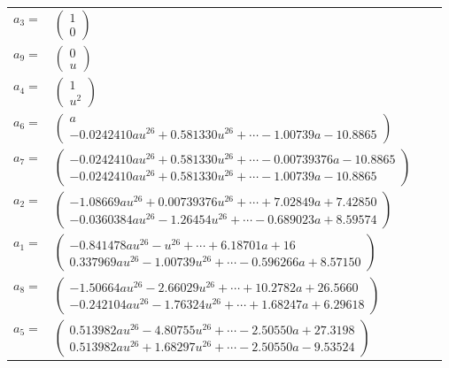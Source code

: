 \documentclass[1p]{elsarticle_modified}
\theoremstyle{definition}
\begin{document}
\begin{tabular}{m{7pt} m{180pt} m{7pt} m{180pt} }
\flushright $a_{3}=$&$\begin{pmatrix}1\\0\end{pmatrix}$ \\
\flushright $a_{9}=$&$\begin{pmatrix}0\\u\end{pmatrix}$ \\
\flushright $a_{4}=$&$\begin{pmatrix}1\\u^2\end{pmatrix}$ \\
\flushright $a_{6}=$&$\begin{pmatrix}a\\-0.0242410 a u^{26}+0.581330 u^{26}+\cdots-1.00739 a-10.8865\end{pmatrix}$ \\
\flushright $a_{7}=$&$\begin{pmatrix}-0.0242410 a u^{26}+0.581330 u^{26}+\cdots-0.00739376 a-10.8865\\-0.0242410 a u^{26}+0.581330 u^{26}+\cdots-1.00739 a-10.8865\end{pmatrix}$ \\
\flushright $a_{2}=$&$\begin{pmatrix}-1.08669 a u^{26}+0.00739376 u^{26}+\cdots+7.02849 a+7.42850\\-0.0360384 a u^{26}-1.26454 u^{26}+\cdots-0.689023 a+8.59574\end{pmatrix}$ \\
\flushright $a_{1}=$&$\begin{pmatrix}-0.841478 a u^{26}-u^{26}+\cdots+6.18701 a+16\\0.337969 a u^{26}-1.00739 u^{26}+\cdots-0.596266 a+8.57150\end{pmatrix}$ \\
\flushright $a_{8}=$&$\begin{pmatrix}-1.50664 a u^{26}-2.66029 u^{26}+\cdots+10.2782 a+26.5660\\-0.242104 a u^{26}-1.76324 u^{26}+\cdots+1.68247 a+6.29618\end{pmatrix}$ \\
\flushright $a_{5}=$&$\begin{pmatrix}0.513982 a u^{26}-4.80755 u^{26}+\cdots-2.50550 a+27.3198\\0.513982 a u^{26}+1.68297 u^{26}+\cdots-2.50550 a-9.53524\end{pmatrix}$ \\

\end{tabular}
\end{document}
